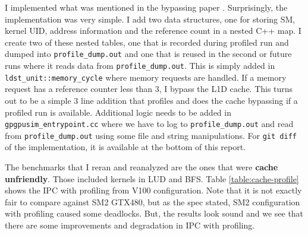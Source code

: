 \documentclass{article}
\begin{document}
I implemented what was mentioned in the bypassing paper \cite{cachebypassing}. Surprisingly, the implementation was very simple. I add two data structures, one for storing SM, kernel UID, address information and the reference count in a nested C++ map. I create two of these nested tables, one that is recorded during profiled run and dumped into \verb|profile_dump.out| and one that is reused in the second or future runs where it reads data from \verb|profile_dump.out|. This is simply added in \verb|ldst_unit::memory_cycle| where memory requests are handled. If a memory request has a reference counter less than 3, I bypass the L1D cache. This turns out to be a simple 3 line addition that profiles and does the cache bypassing if a profiled run is available. Additional logic needs to be added in \verb|gpgpusim_entrypoint.cc| where we have to log to \verb|profile_dump.out| and read from \verb|profile_dump.out| using some file and string manipulations. For \verb|git diff| of the implementation, it is available at the bottom of this report.

The benchmarks that I reran and reanalyzed are the ones that were \textbf{cache unfriendly}. Those included kernels in LUD and BFS. Table \ref{table:cache-profile} shows the IPC with profiling from V100 configuration. Note that it is not exactly fair to compare against SM2 GTX480, but as the spec stated, SM2 configuration with profiling caused some deadlocks. But, the results look sound and we see that there are some improvements and degradation in IPC with profiling.
\end{document}
